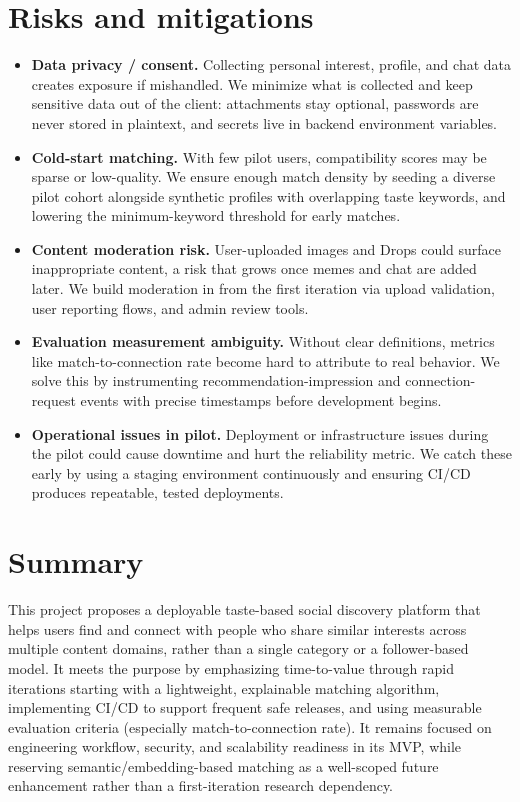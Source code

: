 \documentclass[11pt,a4paper]{article}
\begin{document}
\section{Risks and mitigations}
\begin{itemize}[leftmargin=0.7cm]
    \item \textbf{Data privacy / consent.} Collecting personal interest, profile, and chat data creates exposure if mishandled. We minimize what is collected and keep sensitive data out of the client: attachments stay optional, passwords are never stored in plaintext, and secrets live in backend environment variables.
    \item \textbf{Cold-start matching.} With few pilot users, compatibility scores may be sparse or low-quality. We ensure enough match density by seeding a diverse pilot cohort alongside synthetic profiles with overlapping taste keywords, and lowering the minimum-keyword threshold for early matches.
    \item \textbf{Content moderation risk.} User-uploaded images and Drops could surface inappropriate content, a risk that grows once memes and chat are added later. We build moderation in from the first iteration via upload validation, user reporting flows, and admin review tools.
    \item \textbf{Evaluation measurement ambiguity.} Without clear definitions, metrics like match-to-connection rate become hard to attribute to real behavior. We solve this by instrumenting recommendation-impression and connection-request events with precise timestamps before development begins.
    \item \textbf{Operational issues in pilot.} Deployment or infrastructure issues during the pilot could cause downtime and hurt the reliability metric. We catch these early by using a staging environment continuously and ensuring CI/CD produces repeatable, tested deployments.
\end{itemize}

\section{Summary}
This project proposes a deployable taste-based social discovery platform that helps users find and connect with people who share similar interests across multiple content domains, rather than a single category or a follower-based model. It meets the purpose by emphasizing time-to-value through rapid iterations starting with a lightweight, explainable matching algorithm, implementing CI/CD to support frequent safe releases, and using measurable evaluation criteria (especially match-to-connection rate). It remains focused on engineering workflow, security, and scalability readiness in its MVP, while reserving semantic/embedding-based matching as a well-scoped future enhancement rather than a first-iteration research dependency.
\end{document}
